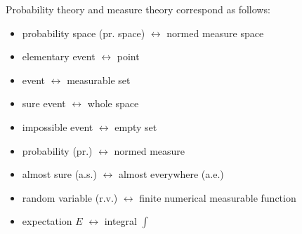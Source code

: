 Probability theory and measure theory correspond as follows:

\begin{itemize}
\item probability space (pr. space) $\leftrightarrow$ normed measure space
\item elementary event $\leftrightarrow$ point
\item event $\leftrightarrow$ measurable set
\item sure event $\leftrightarrow$ whole space
\item impossible event $\leftrightarrow$ empty set
\item probability (pr.) $\leftrightarrow$ normed measure
\item almost sure (a.s.) $\leftrightarrow$ almost everywhere (a.e.)
\item random variable (r.v.) $\leftrightarrow$ finite numerical measurable function
\item expectation $E$ $\leftrightarrow$ integral $\int$
\end{itemize}
